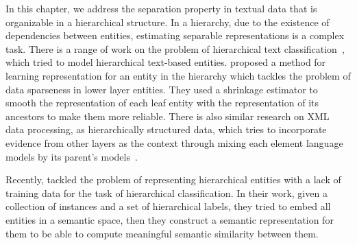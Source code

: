 In this chapter, we address the separation property in textual data that is organizable in a hierarchical structure. In a hierarchy, due to the existence of dependencies between entities, estimating separable representations is a complex task. There is a range of work on the problem of hierarchical text classification~\citep{Sebastiani:2002, Sun:2001}, which tried to model hierarchical text-based entities. \citet{McCallum:1998} proposed a method for learning representation for an entity in the hierarchy which tackles the problem of data sparseness in lower layer entities. They used a shrinkage estimator to smooth the representation of each leaf entity with the representation of its ancestors to make them more reliable. 
There is also similar research on XML data processing, as hierarchically structured data, which tries to incorporate evidence from other layers as the context through mixing each element language models by its parent's models~\citep{sigurbjornsson:2004,ogilvie:2004}.
%

Recently, \citet{Song:2014} tackled the problem of representing hierarchical entities with a lack of training data for the task of hierarchical classification.  In their work, given a collection of instances and a set of hierarchical labels, they tried to embed all entities in a semantic space, then they construct a semantic representation for them to be able to compute meaningful semantic similarity between them.
%

